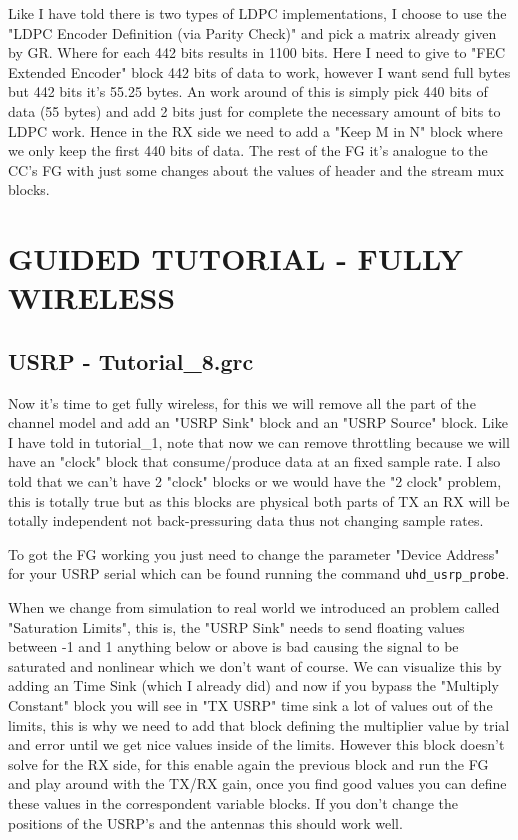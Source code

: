 \documentclass[a4paper, 10pt, conference]{ieeeconf}      %
\begin{document}
    Like I have told there is two types of LDPC implementations, I choose to use the "LDPC Encoder Definition (via Parity Check)" and pick a matrix already given by GR. Where for each 442 bits results in 1100 bits. Here I need to give to "FEC Extended Encoder" block 442 bits of data to work, however I want send full bytes but 442 bits it's 55.25 bytes. An work around of this is simply pick 440 bits of data (55 bytes) and add 2 bits just for complete the necessary amount of bits to LDPC work. Hence in the RX side we need to add a "Keep M in N" block where we only keep the first 440 bits of data. The rest of the FG it's analogue to the CC's FG with just some changes about the values of header and the stream mux blocks.
    
\section{GUIDED TUTORIAL - FULLY WIRELESS}
\subsection{USRP - Tutorial\_8.grc}
    Now it's time to get fully wireless, for this we will remove all the part of the channel model and add an "USRP Sink" block and an "USRP Source" block. Like I have told in tutorial\_1, note that now we can remove throttling because we will have an "clock" block that consume/produce data at an fixed sample rate. I also told that we can't have 2 "clock" blocks or we would have the "2 clock" problem, this is totally true but as this blocks are physical both parts of TX an RX will be totally independent not back-pressuring data thus not changing sample rates.
    
    To got the FG working you just need to change the parameter "Device Address" for your USRP serial which can be found running the command \verb|uhd_usrp_probe|. 
    
    When we change from simulation to real world we introduced an problem called "Saturation Limits", this is, the "USRP Sink" needs to send floating values between -1 and 1 anything below or above is bad causing the signal to be saturated and nonlinear which we don't want of course. We can visualize this by adding an Time Sink (which I already did) and now if you bypass the "Multiply Constant" block you will see in "TX USRP" time sink a lot of values out of the limits, this is why we need to add that block defining the multiplier value by trial and error until we get nice values inside of the limits. However this block doesn't solve for the RX side, for this enable again the previous block and run the FG and play around with the TX/RX gain, once you find good values you can define these values in the correspondent variable blocks. If you don't change the positions of the USRP's and the antennas this should work well.
    
\end{document}
